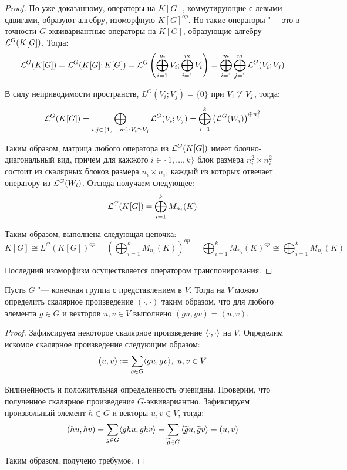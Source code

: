 \begin{proof}
	По уже доказанному, операторы на $K[G]$, коммутирующие с левыми сдвигами, образуют алгебру, изоморфную $K[G]^{op}$. Но такие операторы "--- это в точности $G$-эквивариантные операторы на $K[G]$, образующие алгебру $\mathcal L^G(K[G])$. Тогда:
	\[\mathcal L^G(K[G]) = \mathcal L^G(K[G]; K[G]) = \mathcal L^G\left(\bigoplus_{i=1}^mV_i; \bigoplus_{i=1}^mV_i\right) = \bigoplus_{i = 1}^m\bigoplus_{j=1}^m \mathcal L^G(V_i; V_j)\]
	
	В силу неприводимости пространств, $L^G(V_i; V_j) = \{0\}$ при $V_i \centernot\cong V_j$, тогда:
	\[\mathcal L^G(K[G]) = \bigoplus_{i, j \in \{1, \dotsc, m\}: V_i \cong V_j}\mathcal L^G(V_i; V_j) = \bigoplus_{i = 1}^k\left(\mathcal L^G(W_i)\right)^{\oplus n_i^2}\]
	
	Таким образом, матрица любого оператора из $\mathcal L^G(K[G])$ имеет блочно-диагональный вид, причем	для кажжого $i \in \{1, \dotsc, k\}$ блок размера $n_i^2 \times n_i^2$ состоит из скалярных блоков размера $n_i \times n_i$, каждый из которых отвечает оператору из $\mathcal L^G(W_i)$. Отсюда получаем следующее:
	\[\mathcal L^G(K[G]) = \bigoplus_{i = 1}^kM_{n_i}(K)\]
	
	Таким образом, выполнена следующая цепочка:
	\[K[G] \cong L^G(K[G])^{op} = \left(\bigoplus_{i = 1}^kM_{n_i}(K)\right)^{op} = \bigoplus_{i=1}^kM_{n_i}(K)^{op} \cong \bigoplus_{i=1}^kM_{n_i}(K)\]
	
	Последний изоморфизм осуществляется оператором транспонирования.
\end{proof}

\begin{proposition}
	Пусть $G$ "--- конечная группа с представлением в $V$. Тогда на $V$ можно определить скалярное произведение $(\cdot, \cdot)$ таким образом, что для любого элемента $g \in G$ и векторов $u, v \in V$ выполнено $(gu, gv) = (u, v)$.
\end{proposition}

\begin{proof}
	Зафиксируем некоторое скалярное произведение $\langle \cdot, \cdot \rangle$ на $V$. Определим искомое скалярное произведение следующим образом:
	\[(u, v) := \sum_{g \in G}\langle gu, gv \rangle,~u, v \in V\]
	
	Билинейность и положительная определенность очевидны. Проверим, что полученное скалярное произведение $G$-эквивариантно. Зафиксируем произвольный элемент $h \in G$ и векторы $u, v \in V$, тогда:
	\[(hu, hv) = \sum_{g \in G}\langle ghu, ghv \rangle =  \sum_{\widetilde g \in G}\left\langle \widetilde gu, \widetilde gv \right\rangle = (u, v)\]
	
	Таким образом, получено требумое.
\end{proof}

